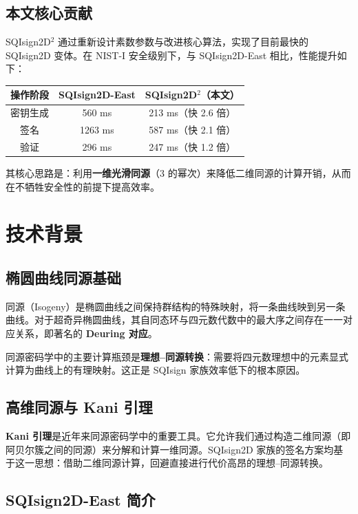 \documentclass[12pt,a4paper]{ctexart}
\theoremstyle{remark}
\begin{document}
\subsection{本文核心贡献}

SQIsign2D$^2$ 通过重新设计素数参数与改进核心算法，实现了目前最快的 SQIsign2D 变体。在 NIST-I 安全级别下，与 SQIsign2D-East 相比，性能提升如下：

\begin{table}[h]
\centering
\begin{tabular}{ccc}
\toprule
操作阶段 & SQIsign2D-East & SQIsign2D$^2$（本文） \\
\midrule
密钥生成 & 560 ms & 213 ms（快 2.6 倍） \\
签名 & 1263 ms & 587 ms（快 2.1 倍） \\
验证 & 296 ms & 247 ms（快 1.2 倍） \\
\bottomrule
\end{tabular}
\end{table}

其核心思路是：利用\textbf{一维光滑同源}（3 的幂次）来降低二维同源的计算开销，从而在不牺牲安全性的前提下提高效率。

\section{技术背景}

\subsection{椭圆曲线同源基础}

同源（Isogeny）是椭圆曲线之间保持群结构的特殊映射，将一条曲线映到另一条曲线。对于超奇异椭圆曲线，其自同态环与四元数代数中的最大序之间存在一一对应关系，即著名的 \textbf{Deuring 对应}。

同源密码学中的主要计算瓶颈是\textbf{理想--同源转换}：需要将四元数理想中的元素显式计算为曲线上的有理映射。这正是 SQIsign 家族效率低下的根本原因。

\subsection{高维同源与 Kani 引理}

\textbf{Kani 引理}是近年来同源密码学中的重要工具。它允许我们通过构造二维同源（即阿贝尔簇之间的同源）来分解和计算一维同源。SQIsign2D 家族的签名方案均基于这一思想：借助二维同源计算，回避直接进行代价高昂的理想--同源转换。

\subsection{SQIsign2D-East 简介}
\end{document}

